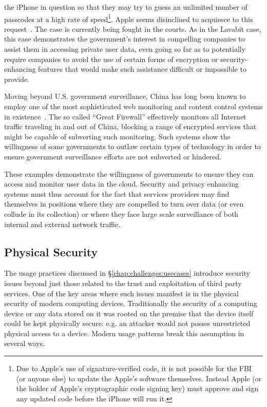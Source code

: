 \begin{packed_desc}
  the iPhone in question so that they may try to guess an unlimited
  number of passcodes at a high rate of speed\footnote{Due to Apple's
    use of signature-verified code, it is not possible for the FBI (or
    anyone else) to update the Apple's software themselves. Instead
    Apple (or the holder of Apple's cryptographic code signing key)
    must approve and sign any updated code before the iPhone will run
    it.}\cite{eff-applecrypto}. Apple seems disinclined to acquiesce
  to this request~\cite{apple-fbiletter}. The case is currently being
  fought in the courts. As in the Lavabit case, this case demonstrates
  the government's interest in compelling companies to assist them in
  accessing private user data, even going so far as to potentially
  require companies to avoid the use of certain forms of encryption or
  security-enhancing features that would make such assistance
  difficult or impossible to provide.
\item[The Great Firewall:] Moving beyond U.S. government surveillance,
  China has long been known to employ one of the most sophisticated
  web monitoring and content control systems in
  existence~\cite{rsf-china}. The so called ``Great Firewall''
  effectively monitors all Internet traffic traveling in and out of
  China, blocking a range of encrypted services that might be capable
  of subverting such monitoring. Such systems show the willingness of
  some governments to outlaw certain types of technology in order to
  ensure government surveillance efforts are not subverted or
  hindered.
\end{packed_desc}

These examples demonstrate the willingness of governments to ensure
they can access and monitor user data in the cloud. Security and
privacy enhancing systems must thus account for the fact that services
providers may find themselves in positions where they are compelled to
turn over data (or even collude in its collection) or where they face
large scale surveillance of both internal and external network
traffic.

\subsection{Physical Security}

The usage practices discussed in \S\ref{chap:challenges:usecases}
introduce security issues beyond just those related to the trust and
exploitation of third party services. One of the key areas where such
issues manifest is in the physical security of modern computing
devices. Traditionally the security of a computing device or any data
stored on it was rooted on the premise that the device itself could be
kept physically secure: e.g. an attacker would not posses unrestricted
physical access to a device. Modern usage patterns break this
assumption in several ways.

